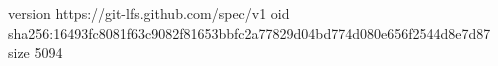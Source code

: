 version https://git-lfs.github.com/spec/v1
oid sha256:16493fc8081f63c9082f81653bbfc2a77829d04bd774d080e656f2544d8e7d87
size 5094

